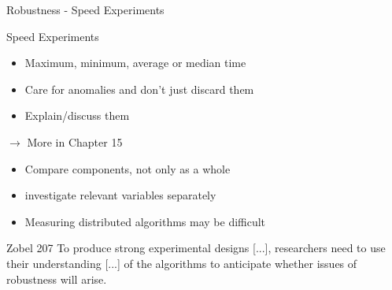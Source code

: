 \documentclass{beamer}
\begin{document}
\begin{frame}{Robustness - Speed Experiments}
\begin{block}{Speed Experiments}
\begin{itemize}
\item Maximum, minimum, average or median time 
\item Care for anomalies and don't just discard them
\item Explain/discuss them
\end{itemize}
$\rightarrow$ More in Chapter 15
\end{block}

\end{frame}

\begin{frame}
\begin{itemize}
\item Compare components, not only as a whole
\item investigate relevant variables separately
\item Measuring distributed algorithms may be difficult 
\end{itemize}
\begin{block}{Zobel 207}
To produce strong experimental designs [...], researchers need to use their understanding [...] of the algorithms to
anticipate whether issues of robustness will arise.
\end{block}

\end{frame}
\end{document}

